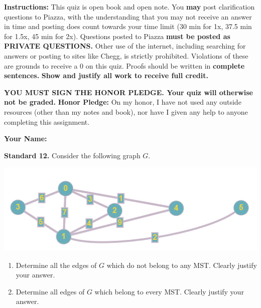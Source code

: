 \documentclass[11pt]{article}
\begin{document}
\renewcommand{\headrulewidth}{0.5pt}

\phantom{Test}

\begin{small}
\noindent \textbf{Instructions:} This quiz is open book and open note. You \textbf{may} post clarification questions to Piazza, with the understanding that you may not receive an answer in time and posting does count towards your time limit (30 min for 1x, 37.5 min for 1.5x, 45 min for 2x). Questions posted to Piazza \textbf{must be posted as PRIVATE QUESTIONS.} Other use of the internet, including searching for answers or posting to sites like Chegg, is strictly prohibited. Violations of these are grounds to receive a 0 on this quiz. Proofs should be written in \textbf{complete sentences.} \textbf{Show and justify all work to receive full credit.} 

\noindent \textbf{YOU MUST SIGN THE HONOR PLEDGE. Your quiz will otherwise not be graded.}  
\noindent \textbf{Honor Pledge:} On my honor, I have not used any outside resources (other than my notes and book), nor have I given any help to anyone completing this assignment. 

\noindent \textbf{Your Name:} \underline{\hskip 250pt}
\end{small} 

\hrulefill 


\pagebreak 

\noindent \textbf{Standard 12.} Consider the following graph $G$. 

\begin{center}
\noindent \includegraphics[scale=0.85]{S12_Graph.png}
\end{center}

\begin{enumerate}[label=(\alph*)]
\item Determine all the edges of $G$ which do not belong to any MST. Clearly justify your answer. \\


\pagebreak

\item Determine all edges of $G$ which belong to every MST. Clearly justify your answer. \\


\end{enumerate}
\end{document}
